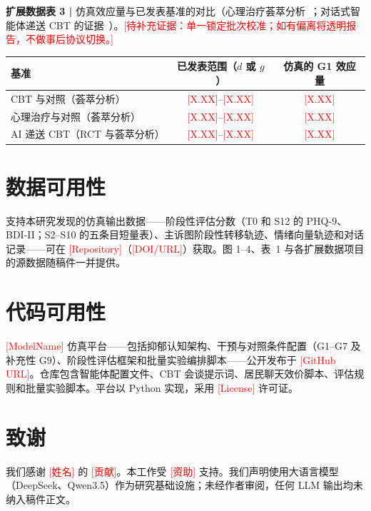 \documentclass[11pt,a4paper]{article}
\newcommand{\ph}[1]{\textcolor{red}{[#1]}}
\begin{document}
\begin{table}[h]
\parbox{0.9\textwidth}{\footnotesize\textbf{扩展数据表 3 |} 仿真效应量与已发表基准的对比（心理治疗荟萃分析~\cite{cuijpers2013,hofmann2012,cuijpers2020}；对话式智能体递送 CBT 的证据~\cite{heinz2025,hang2026}）。\ph{待补充证据：单一锁定批次校准；如有偏离将透明报告，不做事后协议切换。}}
\par\smallskip
\centering
\footnotesize
\begin{tabular}{@{}lcc@{}}
\toprule
基准 & 已发表范围（$d$ 或 $g$） & 仿真的 G1 效应量 \\
\midrule
CBT 与对照（荟萃分析） & \ph{X.XX}--\ph{X.XX} & \ph{X.XX} \\
心理治疗与对照（荟萃分析） & \ph{X.XX}--\ph{X.XX} & \ph{X.XX} \\
AI 递送 CBT（RCT 与荟萃分析） & \ph{X.XX}--\ph{X.XX} & \ph{X.XX} \\
\bottomrule
\end{tabular}
\end{table}

\section*{数据可用性}

支持本研究发现的仿真输出数据——阶段性评估分数（T0 和 S12 的 PHQ-9、BDI-II；S2--S10 的五条目短量表）、主诉图阶段性转移轨迹、情绪向量轨迹和对话记录——可在 \ph{Repository}（\ph{DOI/URL}）获取。图 1--4、表~1 与各扩展数据项目的源数据随稿件一并提供。

\section*{代码可用性}

\ph{ModelName} 仿真平台——包括抑郁认知架构、干预与对照条件配置（G1--G7 及补充性 G9）、阶段性评估框架和批量实验编排脚本——公开发布于 \ph{GitHub URL}。仓库包含智能体配置文件、CBT 会谈提示词、居民聊天效价脚本、评估规则和批量实验脚本。平台以 Python 实现，采用 \ph{License} 许可证。

\section*{致谢}

我们感谢 \ph{姓名} 的 \ph{贡献}。本工作受 \ph{资助} 支持。我们声明使用大语言模型（DeepSeek、Qwen3.5）作为研究基础设施；未经作者审阅，任何 LLM 输出均未纳入稿件正文。
\end{document}
